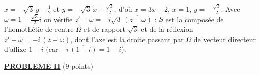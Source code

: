 \begin{description}
\begin{enumerate}
			$x = -\sqrt{3}\,y - \frac{1}{2}$ et $y = -\sqrt{3}\,x + \frac{\sqrt{3}}{2}$, d'où $x = 3x - 2$, $x = 1$, $y = -\frac{\sqrt{3}}{2}$.
			Avec $\omega = 1 - \frac{\sqrt{3}}{2}i$ on vérifie $z' - \omega = -i\sqrt{3}\,\overline{(z - \omega)}$ : $\bar{S}$ est la composée de l'homothétie de centre $\Omega$ et de rapport $\sqrt{3}$ et de la réflexion $z' - \omega = -i\,\overline{(z - \omega)}$,
			dont l'axe est la droite passant par $\Omega$ de vecteur directeur d'affixe $1 - i$ (car $-i\,\overline{(1-i)} = 1 - i$).
			\par\noindent{}
	\end{enumerate}
\end{description}
\noindent \underline{\textsc{\textbf{PROBLEME II}}} (9 points)
